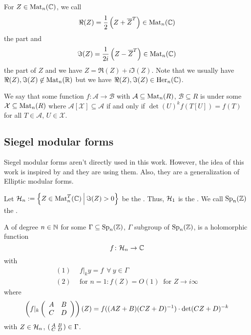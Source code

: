 For $Z \in \operatorname{Mat}_n(\mathbb{C})$, we call
\[ \Re(Z) = \frac{1}{2} \left(Z + \overline{Z}^{T}\right) \in \operatorname{Mat}_n(\mathbb{C}) \]
the  part and
\[ \Im(Z) = \frac{1}{2i} \left(Z - \overline{Z}^{T}\right)  \in \operatorname{Mat}_n(\mathbb{C}) \]
the  part of $Z$ and we have $Z = \Re(Z) + i \Im(Z)$.
Note that we usually have $\Re(Z),\Im(Z) \not\in \operatorname{Mat}_n(\mathbb{R})$ but we have $\Re(Z),\Im(Z) \in \operatorname{Her}_n(\mathbb{C})$.

We say that some function $f \colon \mathcal{A} \rightarrow \mathcal{B}$ with $\mathcal{A} \subseteq \operatorname{Mat}_n(R)$, $\mathcal{B} \subseteq R$ is  under some $\mathcal{X} \subseteq \operatorname{Mat}_n(R)$ where $\mathcal{A}[\mathcal{X}] \subseteq \mathcal{A}$ if and only if $\det(U)^k f(T[U]) = f(T)$ for all $T \in \mathcal{A}$, $U \in \mathcal{X}$.


\subsection{Siegel modular forms}

Siegel modular forms aren't directly used in this work. However, the idea of this work is inspired by \cite{PoorYuen07Comp} and they are using them. Also, they are a generalization of Elliptic modular forms.

Let $\SiegelHalfPlane_n := \Set{Z \in \M_n^T(\C)}{\Im(Z) > 0}$ be the .
Thus, $\mathcal{H}_1$ is the .
We call $\operatorname{Sp}_n(\mathbb{Z})$ the .


A  of degree $n\in\mathbb{N}$ for some $\Gamma \subseteq \operatorname{Sp}_n(\mathbb{Z})$, $\Gamma$ subgroup of $\operatorname{Sp}_n(\mathbb{Z})$, is a holomorphic function
\[ f \colon \mathcal{H}_n \rightarrow \mathbb{C} \]
with
\begin{align*}
(1) \ \ & f |_k y = f \ \ \forall \ y \in \Gamma \\
(2) \ \ & \text{for } n = 1 \colon f(Z) = O(1) \ \text{ for } Z \rightarrow i \infty
\end{align*}
where
\[ \left( f|_k \left( \begin{array}{cc} A & B \\ C & D \end{array} \right) \right) (Z) =
f((AZ + B)(CZ + D)^{-1}) \cdot \det(CZ + D)^{-k} \]
with $Z \in \mathcal{H}_n$, $\left( \begin{smallmatrix} A & B \\ C & D \end{smallmatrix} \right) \in \Gamma$.

